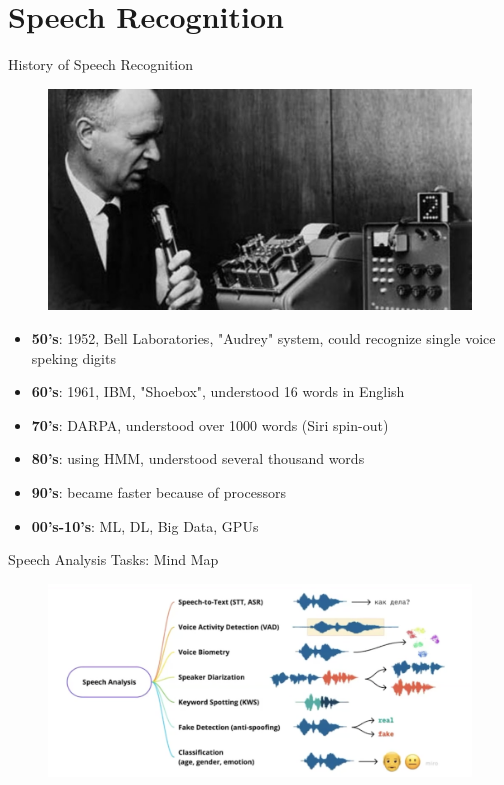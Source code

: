 
\section{Speech Recognition}
\begin{frame}{History of Speech Recognition}
	\begin{figure}
		\centering
		\includegraphics[width=0.7\linewidth]{figs/audrey.png}
	\end{figure}
	\begin{itemize}
		\item \textbf{50's}: 1952, Bell Laboratories, "Audrey" system, could recognize single voice speking digits
		\item \textbf{60's}: 1961, IBM, "Shoebox", understood 16 words in English
		\item \textbf{70's}: DARPA, understood over 1000 words (Siri spin-out)
		\item \textbf{80's}: using HMM, understood several thousand words
		\item \textbf{90's}: became faster because of processors
		\item \textbf{00's-10's}: ML, DL, Big Data, GPUs
	\end{itemize}
\end{frame}
\begin{frame}{Speech Analysis Tasks: Mind Map}
	\begin{figure}
		\centering
		\includegraphics[width=0.99\linewidth]{figs/tasks_2.png}
	\end{figure}
\end{frame}
